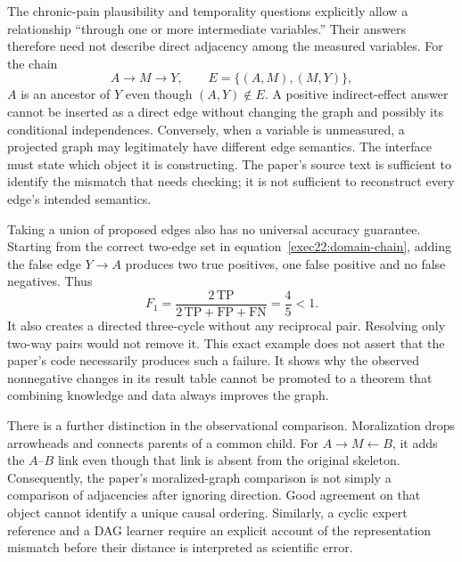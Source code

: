 The chronic-pain plausibility and temporality questions explicitly allow a
relationship ``through one or more intermediate variables.'' Their answers
therefore need not describe direct adjacency among the measured variables.
For the chain
\begin{equation}
 A\longrightarrow M\longrightarrow Y,
 \qquad E=\{(A,M),(M,Y)\},
 \label{exec22:domain-chain}
\end{equation}
\(A\) is an ancestor of \(Y\) even though \((A,Y)\notin E\). A positive
indirect-effect answer cannot be inserted as a direct edge without changing the
graph and possibly its conditional independences. Conversely, when a variable
is unmeasured, a projected graph may legitimately have different edge semantics.
The interface must state which object it is constructing. The paper's source
text is sufficient to identify the mismatch that needs checking; it is not
sufficient to reconstruct every edge's intended semantics. \cite{exec22_domain_lin,exec22_domain_reference}

Taking a union of proposed edges also has no universal accuracy guarantee.
Starting from the correct two-edge set in equation~\eqref{exec22:domain-chain},
adding the false edge \(Y\to A\) produces two true positives, one false positive
and no false negatives. Thus
\begin{equation}
 F_1=\frac{2\,\mathrm{TP}}{2\,\mathrm{TP}+\mathrm{FP}+\mathrm{FN}}
     =\frac45<1.
 \label{exec22:domain-f1}
\end{equation}
It also creates a directed three-cycle without any reciprocal pair. Resolving
only two-way pairs would not remove it. This exact example does not assert that
the paper's code necessarily produces such a failure. It shows why the observed
nonnegative changes in its result table cannot be promoted to a theorem that
combining knowledge and data always improves the graph. \cite{exec22_domain_reference}

There is a further distinction in the observational comparison. Moralization
drops arrowheads and connects parents of a common child. For
\(A\to M\leftarrow B\), it adds the \(A\)--\(B\) link even though that link
is absent from the original skeleton. Consequently, the paper's moralized-graph
comparison is not simply a comparison of adjacencies after ignoring direction.
Good agreement on that object cannot identify a unique causal ordering. Similarly,
a cyclic expert reference and a DAG learner require an explicit account of the
representation mismatch before their distance is interpreted as scientific error.

